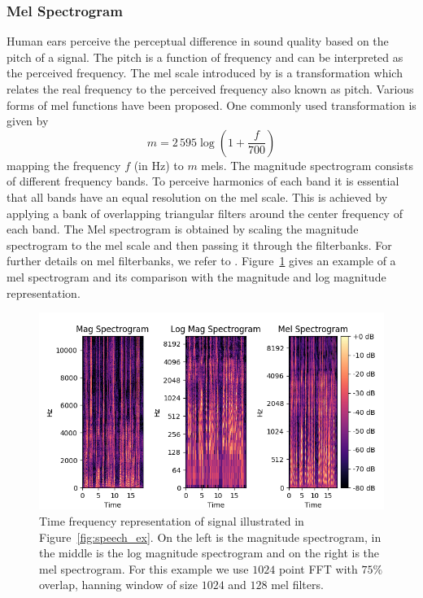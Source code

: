 \subsubsection{Mel Spectrogram}
Human ears perceive the perceptual difference in sound quality based on the pitch of a signal. The pitch is a function of frequency and can be interpreted as the perceived frequency. The mel scale introduced by \cite{stevens1940relation} is a transformation which relates the real frequency to the perceived frequency also known as pitch. Various forms of mel functions have been proposed. One commonly used transformation is given by
\begin{equation}
    m = 2\,595 \log(1+\frac{f}{700})
\end{equation}
mapping the frequency $f$ (in Hz) to $m$ mels.
The magnitude spectrogram consists of different frequency bands. To perceive harmonics of each band it is essential that all bands have an equal resolution on the mel scale. This is achieved by applying a bank of overlapping triangular filters around the center frequency of each band. The Mel spectrogram is obtained by scaling the magnitude spectrogram to the mel scale and then passing it through the filterbanks. For further details on mel filterbanks, we refer to \cite{kopparapu2010choice}. Figure~\ref{fig:time_freq_rep} gives an example of a mel spectrogram and its comparison with the magnitude and log magnitude representation.
\begin{figure}
    \centering
    \includegraphics[width=0.95\columnwidth, height=0.40\columnwidth]{master_thesis_template/figs/freq_res.png}
    \caption[ Time frequency representation of signal]{Time frequency representation of signal illustrated in Figure~\ref{fig:speech_ex}. On the left is the magnitude spectrogram, in the middle is the log magnitude spectrogram and on the right is the mel spectrogram. For this example we use $1024$ point FFT with $75\%$ overlap, hanning window of size $1024$ and $128$ mel filters.}
    \label{fig:time_freq_rep}
\end{figure}

